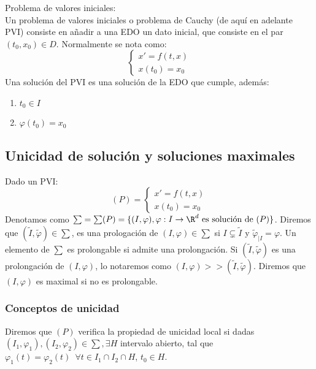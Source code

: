 \documentclass{article}
\begin{document}
\begin{definition} Problema de valores iniciales:\\
    Un problema de valores iniciales o problema de Cauchy (de aquí en adelante PVI)
    consiste en añadir a una EDO un dato inicial, que consiste en el par $(t_0, x_0) \in D$.
    Normalmente se nota como:
    \[
    \left\{
    \begin{array}{l}
        x' = f(t,x) \\
        x(t_0) = x_0
    \end{array}
    \right.
    \]
    Una solución del PVI es una solución de la EDO que cumple, además:
    \begin{enumerate}
        \item $t_0 \in I$
        \item $\varphi(t_0) = x_0$
    \end{enumerate}
\end{definition}

\subsection{Unicidad de solución y soluciones maximales}

Dado un PVI:
\[
(P) = \left\{
\begin{array}{l}
    x' = f(t,x) \\
    x(t_0) = x_0
\end{array}
\right.
\]
Denotamos como $\sum = \sum(P) = \{(I, \varphi), \varphi: I \to \R^d \text{ es solución
de } (P)\}$. Diremos que $(\tilde{I}, \tilde{\varphi}) \in \sum$, es una prologación
de $(I, \varphi) \in \sum$ si $I \subsetneq \tilde{I}$ y $\tilde{\varphi}_{|I} = \varphi$.
Un elemento de $\sum$ es prolongable si admite una prolongación. Si $(\tilde{I},
\tilde{\varphi})$ es una prolongación de $(I, \varphi)$, lo notaremos como $(I, \varphi)
>> (\tilde{I}, \tilde{\varphi})$. Diremos que $(I, \varphi)$ es maximal si no es
prolongable.

\subsubsection{Conceptos de unicidad}

Diremos que $(P)$ verifica la propiedad de unicidad local si dadas $(I_1, \varphi_1),
(I_2, \varphi_2) \in \sum, \exists H$ intervalo abierto, tal que $\varphi_1(t) =
\varphi_2(t)\,\,\, \forall t \in I_1 \cap I_2 \cap H$, $t_0 \in H$.\\
\end{document}
